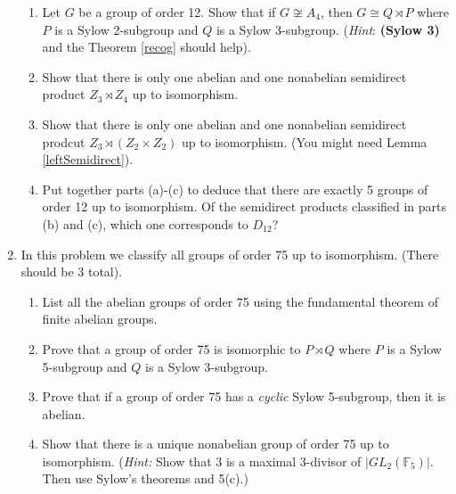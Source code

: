 \documentclass[11pt]{article}
\newcommand{\bF}{\mathbb{F}}
\begin{document}
\begin{enumerate}
  \begin{enumerate}
  \item Let $G$ be a group of order 12.  Show that if $G\not\cong A_4$, then $G\cong Q\rtimes P$ where $P$ is a Sylow 2-subgroup and $Q$ is a Sylow 3-subgroup.  (\textit{Hint}: \textbf{(Sylow 3)} and the Theorem \ref{recog} should help).
  \item Show that there is only one abelian and one nonabelian semidirect product $Z_3\rtimes Z_4$ up to isomorphism.
  \item Show that there is only one abelian and one nonabelian semidirect prodcut $Z_3\rtimes (Z_2\times Z_2)$ up to isomorphism.  (You might need Lemma \ref{leftSemidirect}).
  \item Put together parts (a)-(c) to deduce that there are exactly 5 groups of order 12 up to isomorphism.  Of the semidirect products classified in parts (b) and (c), which one corresponds to $D_{12}$?
  \end{enumerate}
    \item{
  In this problem we classify all groups of order 75 up to isomorphism.  (There should be 3 total).
  \begin{enumerate}
    \item{List all the abelian groups of order 75 using the fundamental theorem of finite abelian groups.}
    \item{Prove that a group of order 75 is isomorphic to $P\rtimes Q$ where $P$ is a Sylow 5-subgroup and $Q$ is a Sylow 3-subgroup.}
    \item{Prove that if a group of order 75 has a \textit{cyclic} Sylow 5-subgroup, then it is abelian.}
    \item{Show that there is a unique nonabelian group of order 75 up to isomorphism.  (\textit{Hint:} Show that 3 is a maximal 3-divisor of $|GL_2(\bF_5)|$.  Then use Sylow's theorems and 5(c).)}
  \end{enumerate}
  }
\end{enumerate}
\end{document}
